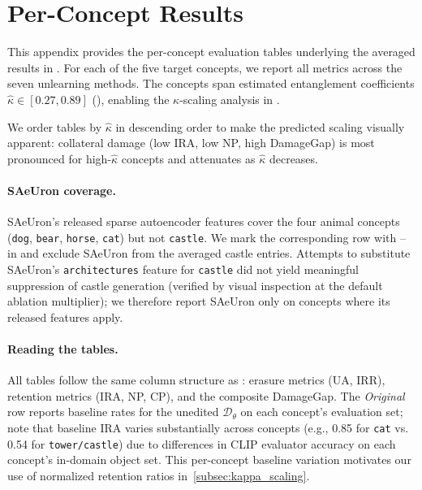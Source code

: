 \section{Per-Concept Results}
\label{app:per_concept_tables}

This appendix provides the per-concept evaluation tables underlying the averaged results in . For each of the five target concepts, we report all metrics across the seven unlearning methods. The concepts span estimated entanglement coefficients $\hat\kappa \in [0.27, 0.89]$ (), enabling the $\kappa$-scaling analysis in .

We order tables by $\hat\kappa$ in descending order to make the predicted scaling visually apparent: collateral damage (low IRA, low NP, high DamageGap) is most pronounced for high-$\hat\kappa$ concepts and attenuates as $\hat\kappa$ decreases.

\paragraph{SAeUron coverage.} 
SAeUron's released sparse autoencoder features cover the four animal concepts (\texttt{dog}, \texttt{bear}, \texttt{horse}, \texttt{cat}) but not \texttt{castle}. We mark the corresponding row with -- in  and exclude SAeUron from the averaged castle entries. Attempts to substitute SAeUron's \texttt{architectures} feature for \texttt{castle} did not yield meaningful suppression of castle generation (verified by visual inspection at the default ablation multiplier); we therefore report SAeUron only on concepts where its released features apply.

\paragraph{Reading the tables.}
All tables follow the same column structure as : erasure metrics (UA, IRR), retention metrics (IRA, NP, CP), and the composite DamageGap. The \emph{Original} row reports baseline rates for the unedited $\mathcal{D}_\theta$ on each concept's evaluation set; note that baseline IRA varies substantially across concepts (e.g., {0.85} for \texttt{cat} vs. {0.54} for \texttt{tower/castle}) due to differences in CLIP evaluator accuracy on each concept's in-domain object set. This per-concept baseline variation motivates our use of normalized retention ratios in~\cref{subsec:kappa_scaling}.


